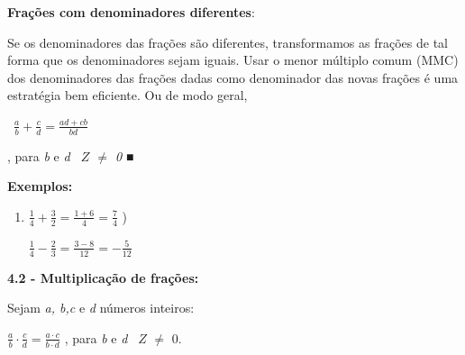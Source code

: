\documentclass[12pt]{article}
\renewcommand{\_}{\kern-1.5pt\textunderscore\kern-1.5pt}
\begin{document}
\vspace{\baselineskip}
\tab \textbf{Frações com denominadores diferentes}: \par

\begin{justify}
Se os denominadores das frações são diferentes, transformamos as frações de tal forma que os denominadores sejam iguais. Usar o menor múltiplo comum (MMC) dos denominadores das frações dadas como denominador das novas frações é uma estratégia bem eficiente. Ou de modo geral, 
\end{justify}\par

\begin{justify}
\  \tab \tab  \( \frac{a}{b}+\frac{c}{d}=\frac{ad+cb}{bd}~~~ \) {\fontsize{16pt}{19.2pt}\selectfont  , para \textit{b }e\textit{ d  \   \( Z \)   $ \neq $  0} ■\par}
\end{justify}\par

\textbf{Exemplos:}\par

\begin{enumerate}
	\item  \( \frac{1}{4}+\frac{3}{2}=\frac{1+6}{4}=\frac{7}{4} \) \tab \tab {}){\fontsize{16pt}{19.2pt}\selectfont   \( \frac{1}{4}-\frac{2}{3}=\frac{3-8}{12}=-\frac{5}{12} \) \par}
\end{enumerate}\par


\vspace{\baselineskip}
\textbf{4.2 - Multiplicação de frações:}\par

Sejam \textit{a, b,c} e \textit{d} números inteiros: \par


\vspace{\baselineskip}
\par 
\setlength{\parskip}{6.0pt}
\tab \tab \tab  \( \frac{a}{b} \cdot \frac{c}{d}=\frac{a  \cdot c }{b  \cdot d} \) \tab \tab , para \textit{b} e \textit{d} \textit{\   \( Z \) } $ \neq $  0.\par
\end{document}

